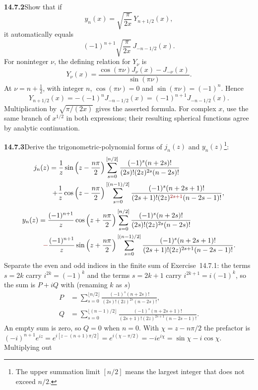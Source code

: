 \par\bigskip
\noindent\textbf{14.7.2}\quad Show that if
\[
y_{n}(x)=\sqrt{\frac{\pi}{2x}}\,Y_{n+1/2}(x),
\]
it automatically equals
\[
(-1)^{n+1}\sqrt{\frac{\pi}{2x}}\,J_{-n-1/2}(x).
\]
\solution
For noninteger $\nu$, the defining relation for $Y_\nu$ is
\[
Y_\nu(x)=\frac{\cos(\pi\nu)J_\nu(x)-J_{-\nu}(x)}{\sin(\pi\nu)}.
\]
At $\nu=n+\tfrac12$, with integer $n$,
$\cos(\pi\nu)=0$ and $\sin(\pi\nu)=(-1)^n$. Hence
\[
Y_{n+1/2}(x)=-(-1)^nJ_{-n-1/2}(x)
=(-1)^{n+1}J_{-n-1/2}(x).
\]
Multiplication by $\sqrt{\pi/(2x)}$ gives the asserted formula.
For complex $x$, use the same branch of $x^{1/2}$ in both
expressions; their resulting spherical functions agree by analytic
continuation.

\par\bigskip
\noindent\textbf{14.7.3}\quad Derive the trigonometric-polynomial forms
of $j_{n}(z)$ and $y_{n}(z)$\footnote{The upper summation limit
$[n/2]$ means the largest integer that does not exceed $n/2$.}:
\begin{align*}
j_{n}(z)=\frac{1}{z}\sin\left(z-\frac{n\pi}{2}\right)
&\sum_{s=0}^{[n/2]}\frac{(-1)^{s}(n+2s)!}{(2s)!(2z)^{2s}(n-2s)!}\\
+\frac{1}{z}\cos\left(z-\frac{n\pi}{2}\right)
&\sum_{s=0}^{[(n-1)/2]}
\frac{(-1)^{s}(n+2s+1)!}{(2s+1)!(2z)^{\erratum{2s+1}}(n-2s-1)!},
\end{align*}
\begin{align*}
y_{n}(z)=\frac{(-1)^{n+1}}{z}\cos\left(z+\frac{n\pi}{2}\right)
&\sum_{s=0}^{[n/2]}\frac{(-1)^{s}(n+2s)!}{(2s)!(2z)^{2s}(n-2s)!}\\
\erratum{-}\frac{(-1)^{n+1}}{z}\sin\left(z+\frac{n\pi}{2}\right)
&\sum_{s=0}^{[(n-1)/2]}
\frac{(-1)^{s}(n+2s+1)!}{(2s+1)!(2z)^{2s+1}(n-2s-1)!}.
\end{align*}
\solution
Separate the even and odd indices in the finite sum of
Exercise~14.7.1: the terms $s=2k$ carry $i^{2k}=(-1)^k$ and the
terms $s=2k+1$ carry $i^{2k+1}=i(-1)^k$, so the sum is $P+iQ$ with
(renaming $k$ as $s$)
\begin{align*}
P&=\sum_{s=0}^{\lfloor n/2\rfloor}
\frac{(-1)^s(n+2s)!}{(2s)!(2z)^{2s}(n-2s)!},\\
Q&=\sum_{s=0}^{\lfloor(n-1)/2\rfloor}
\frac{(-1)^s(n+2s+1)!}{(2s+1)!(2z)^{2s+1}(n-2s-1)!}.
\end{align*}
An empty sum is zero, so $Q=0$ when $n=0$. With
$\chi=z-n\pi/2$ the prefactor is
$(-i)^{n+1}e^{iz}=e^{i[z-(n+1)\pi/2]}=e^{i(\chi-\pi/2)}=-ie^{i\chi}
=\sin\chi-i\cos\chi$. Multiplying out
